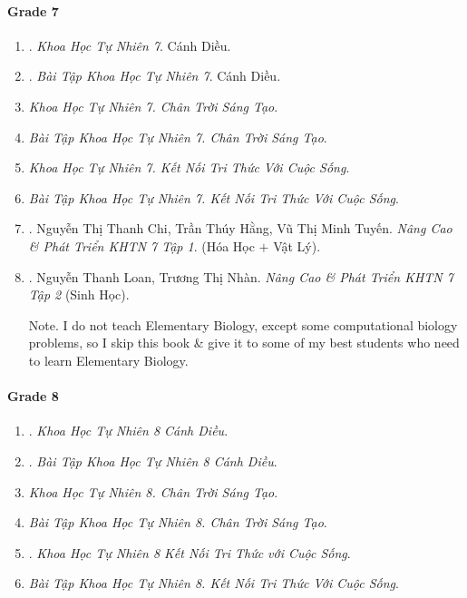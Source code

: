 \documentclass{article}
\begin{document}
\paragraph{Grade 7}

\begin{enumerate}	
	\item \cite{SGK_KHTN_7_Canh_Dieu}. {\it Khoa Học Tự Nhiên 7}. Cánh Diều.\hfill{\sf[done]}
	
	\item \cite{SBT_KHTN_7_Canh_Dieu}. {\it Bài Tập  Khoa Học Tự Nhiên 7}. Cánh Diều.\hfill{\sf[done]}
	
	\item {\it Khoa Học Tự Nhiên 7. Chân Trời Sáng Tạo}.
	
	\item {\it Bài Tập Khoa Học Tự Nhiên 7. Chân Trời Sáng Tạo}.
	
	\item {\it Khoa Học Tự Nhiên 7. Kết Nối Tri Thức Với Cuộc Sống}.
	
	\item {\it Bài Tập Khoa Học Tự Nhiên 7. Kết Nối Tri Thức Với Cuộc Sống}.
	
	\item \cite{ncpt_KHTN_7_tap_1}. Nguyễn Thị Thanh Chi, Trần Thúy Hằng, Vũ Thị Minh Tuyến. {\it Nâng Cao \& Phát Triển KHTN 7 Tập 1}. (Hóa Học $+$ Vật Lý).\hfill{\sf[done]}
	
	\item \cite{ncpt_KHTN_7_tap_2}. Nguyễn Thanh Loan, Trương Thị Nhàn. {\it Nâng Cao \& Phát Triển KHTN 7 Tập 2} (Sinh Học).\hfill{\sf[done]}
	
	{\sf Note.} I do not teach Elementary Biology, except some computational biology problems, so I skip this book \& give it to some of my best students who need to learn Elementary Biology.
\end{enumerate}

\paragraph{Grade 8}

\begin{enumerate}
	\item \cite{SGK_KHTN_8_Canh_Dieu}. {\it Khoa Học Tự Nhiên 8 Cánh Diều}.\hfill{\sf[done]}
	
	\item \cite{SBT_KHTN_8_Canh_Dieu}. {\it Bài Tập Khoa Học Tự Nhiên 8 Cánh Diều}.\hfill{\sf[done]}
	
	\item {\it Khoa Học Tự Nhiên 8. Chân Trời Sáng Tạo}.
	
	\item {\it Bài Tập Khoa Học Tự Nhiên 8. Chân Trời Sáng Tạo}.
	
	\item \cite{SGK_KHTN_8_KNTTVCS}. {\it Khoa Học Tự Nhiên 8 Kết Nối Tri Thức với Cuộc Sống}.\hfill{\sf[done]}
	
	\item {\it Bài Tập Khoa Học Tự Nhiên 8. Kết Nối Tri Thức Với Cuộc Sống}.
\end{enumerate}
\end{document}
